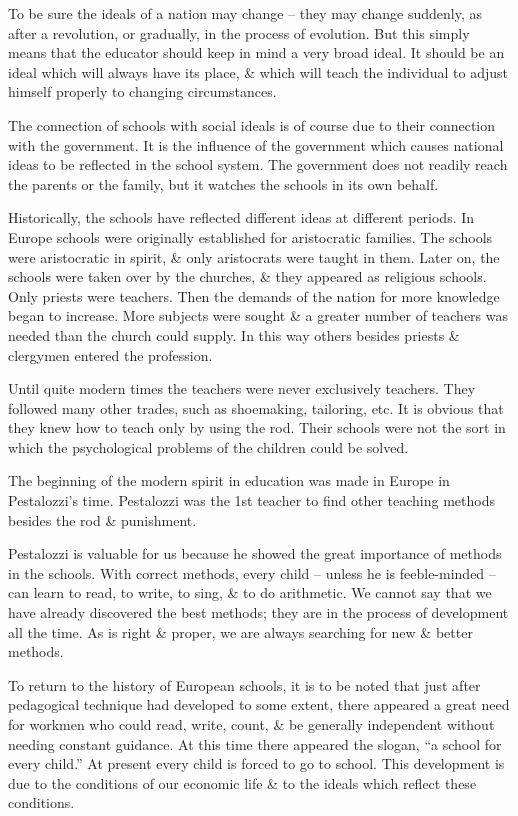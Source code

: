 \documentclass{article}
\numberwithin{equation}{section}
\begin{document}
To be sure the ideals of a nation may change -- they may change suddenly, as after a revolution, or gradually, in the process of evolution. But this simply means that the educator should keep in mind a very broad ideal. It should be an ideal which will always have its place, \& which will teach the individual to adjust himself properly to changing circumstances.

The connection of schools with social ideals is of course due to their connection with the government. It is the influence of the government which causes national ideas to be reflected in the school system. The government does not readily reach the parents or the family, but it watches the schools in its own behalf.

Historically, the schools have reflected different ideas at different periods. In Europe schools were originally established for aristocratic families. The schools were aristocratic in spirit, \& only aristocrats were taught in them. Later on, the schools were taken over by the churches, \& they appeared as religious schools. Only priests were teachers. Then the demands of the nation for more knowledge began to increase. More subjects were sought \& a greater number of teachers was needed than the church could supply. In this way others besides priests \& clergymen entered the profession.

Until quite modern times the teachers were never exclusively teachers. They followed many other trades, such as shoemaking, tailoring, etc. It is obvious that they knew how to teach only by using the rod. Their schools were not the sort in which the psychological problems of the children could be solved.

The beginning of the modern spirit in education was made in Europe in Pestalozzi's time. Pestalozzi was the 1st teacher to find other teaching methods besides the rod \& punishment.

Pestalozzi is valuable for us because he showed the great importance of methods in the schools. With correct methods, every child -- unless he is feeble-minded -- can learn to read, to write, to sing, \& to do arithmetic. We cannot say that we have already discovered the best methods; they are in the process of development all the time. As is right \& proper, we are always searching for new \& better methods.

To return to the history of European schools, it is to be noted that just after pedagogical technique had developed to some extent, there appeared a great need for workmen who could read, write, count, \& be generally independent without needing constant guidance. At this time there appeared the slogan, ``a school for every child.'' At present every child is forced to go to school. This development is due to the conditions of our economic life \& to the ideals which reflect these conditions.
\end{document}
